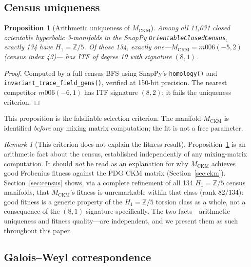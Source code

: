 \documentclass[11pt,a4paper]{article}
\newtheorem{proposition}[theorem]{Proposition}
\theoremstyle{remark}
\newtheorem{remark}[theorem]{Remark}
\newcommand{\MCKM}{M_{\mathrm{CKM}}}
\newcommand{\Zfive}{\mathbb{Z}/5}
\begin{document}
\subsection{Census uniqueness}

\begin{proposition}[Arithmetic uniqueness of $\MCKM$]
\label{prop:unique}
Among all 11,031 closed orientable hyperbolic 3-manifolds in the
SnapPy \texttt{OrientableClosedCensus}, exactly 134 have
$H_1 = \Zfive$.
Of those 134, exactly one---$\MCKM = m006(-5,2)$ (census index 43)---%
has ITF of degree 10 with signature $(8,1)$.
\end{proposition}

\begin{proof}\sloppy
Computed by a full census BFS using SnapPy's \texttt{homology()} and
\texttt{invariant\_trace\_\allowbreak field\_gens()}, verified at 150-bit precision.
The nearest competitor $m006(-6,1)$ has ITF signature $(8,2)$:
it fails the uniqueness criterion.
\fussy\end{proof}

This proposition is the falsifiable selection criterion.
The manifold $\MCKM$ is identified \emph{before} any mixing matrix
computation; the fit is not a free parameter.

\begin{remark}[This criterion does not explain the fitness result]
\label{rem:selection_not_fitness}
Proposition~\ref{prop:unique} is an arithmetic fact about the census,
established independently of any mixing-matrix computation.
It should \emph{not} be read as an explanation for why $\MCKM$ achieves
good Frobenius fitness against the PDG CKM matrix (Section~\ref{sec:ckm}).
Section~\ref{sec:census} shows, via a complete refinement of all 134
$H_1 = \Zfive$ census manifolds, that $\MCKM$'s fitness is unremarkable
within that class (rank 82/134): good fitness is a generic property of
the $H_1 = \Zfive$ torsion class as a whole, not a consequence of the
$(8,1)$ signature specifically.
The two facts---arithmetic uniqueness and fitness quality---are
independent, and we present them as such throughout this paper.
\end{remark}


\subsection{Galois--Weyl correspondence}
\end{document}
